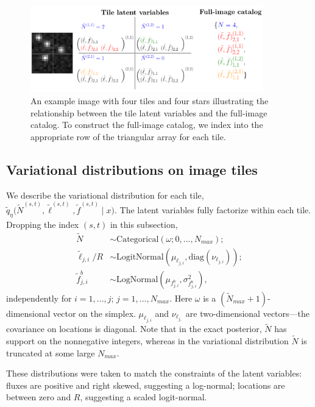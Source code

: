 \begin{figure}[tb]
    \centering
    \includegraphics[width = 0.9\textwidth]{figures/vi_figures/tile_to_full_schematic.png}
    \vspace{-0.6cm}
    \caption{An example image with four tiles and four stars illustrating the relationship between the tile latent variables and the full-image catalog.
    To construct the full-image catalog, we index into the appropriate row of the triangular array for each tile.}
    \label{fig:tile_to_full_schm}
\end{figure}


\subsection{Variational distributions on image tiles}
\label{sec:distr_on_tiles}
We describe the variational distribution for each tile,
$\tilde q_\eta\big(\tilde N^{(s, t)}, \tilde \ell^{(s, t)}, \tilde f^{(s, t)} \mid x\big)$.
The latent variables fully factorize within each tile.
Dropping the index
$(s,t)$ in this subsection,
\begin{align}
    \tilde N &\sim \text{Categorical}(
    \omega; 0, ..., N_{max});  \label{eq:var_distr_n}\\
	\tilde \ell_{j, i} / R &\sim \text{LogitNormal}(\mu_{\ell_{j, i}}, \text{diag}(\nu_{\ell_{j, i}}) )\label{eq:var_distr_loc}; \\
	\tilde f^b_{j, i} &\sim \text{LogNormal}(\mu_{f^b_{j, i}}, \sigma^2_{f^b_{j, i}}), \label{eq:var_distr_f}
\end{align}
independently for $i = 1, ..., j$; $j = 1, ..., N_{max}$.
Here $\omega$ is a $(\tilde N_{max} + 1)$-dimensional vector on the simplex. $\mu_{\ell_{j, i}}$ and $\nu_{\ell_{j, }}$ are two-dimensional vectors---the covariance on locations is diagonal.
Note that in the exact posterior, $\tilde N$ has support on the nonnegative integers, whereas in the variational distribution $\tilde N$ is truncated at some large $N_{max}$.


These distributions were taken to match the constraints of the latent variables: fluxes are positive and right skewed, suggesting a log-normal; locations are between zero and $R$, suggesting a scaled logit-normal.

